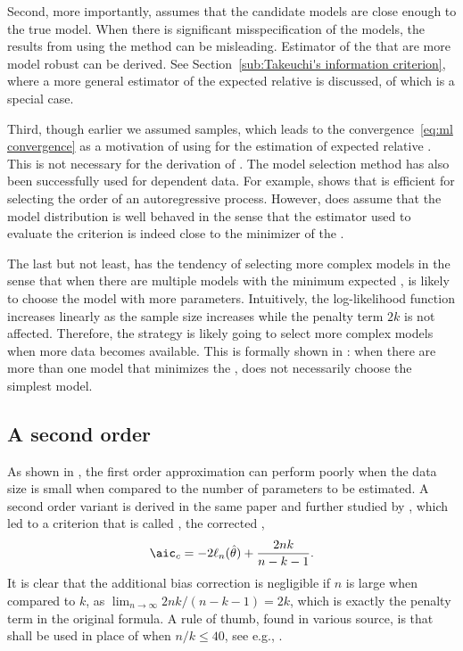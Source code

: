 Second, more importantly, \aic assumes that the candidate models are close
enough to the true model. When there is significant misspecification of the
models, the results from using the \aic method can be misleading. Estimator of
the \kld that are more model robust can be derived. See
Section~\ref{sub:Takeuchi's information criterion}, where a more general
estimator of the expected relative \kld is discussed, of which \aic is a
special case.

Third, though earlier we assumed \iid samples, which leads to the
convergence~\eqref{eq:ml convergence} as a motivation of using \mle for the
estimation of expected relative \kld. This is not necessary for the derivation
of \aic. The \aic model selection method has also been successfully used for
dependent data. For example, \cite{Lee:2001tm} shows that \aic is efficient
for selecting the order of an autoregressive process. However, \aic does
assume that the model distribution is well behaved in the sense that the
estimator used to evaluate the criterion is indeed close to the minimizer of
the \kld.

The last but not least, \aic has the tendency of selecting more complex models
in the sense that when there are multiple models with the minimum expected
\kld, \aic is likely to choose the model with more parameters. Intuitively,
the log-likelihood function increases linearly as the sample size increases
while the penalty term $2k$ is not affected. Therefore, the \aic strategy is
likely going to select more complex models when more data becomes available.
This is formally shown in \cite{Sin:1996vs}: when there are more than one
model that minimizes the \kld, \aic does not necessarily choose the simplest
model.

\subsection{A second order \protect\aic}
\label{sub:A second order aic}

As shown in \cite{Sugiura:1978be}, the first order approximation can perform
poorly when the data size is small when compared to the number of parameters
to be estimated. A second order variant is derived in the same paper and
further studied by \cite{Hurvich:1989ev}, which led to a criterion that is
called \aicc, the corrected \aic,
\begin{equation}
  \aicc = -2\ell_n(\hat\theta) + \frac{2nk}{n-k-1}.
\end{equation}
It is clear that the additional bias correction is negligible if $n$ is large
when compared to $k$, as $\lim_{n\to\infty}2nk/(n-k-1) = 2k$, which is exactly
the penalty term in the original \aic formula. A rule of thumb, found in
various source, is that \aicc shall be used in place of \aic when $n/k\le40$,
see e.g., \cite[][sec.~2.4]{Burnham:2002wc}.

